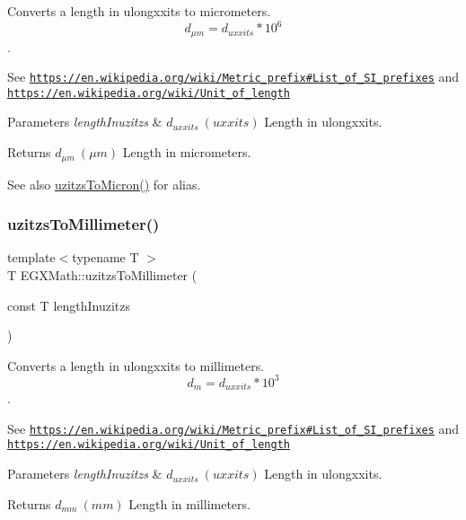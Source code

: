 Converts a length in ulongxxits to micrometers. \[ d_{\mu m}=d_{uxxits} * 10^{6} \]. 

See \href{https://en.wikipedia.org/wiki/Metric_prefix#List_of_SI_prefixes}{\tt https\+://en.\+wikipedia.\+org/wiki/\+Metric\+\_\+prefix\#\+List\+\_\+of\+\_\+\+S\+I\+\_\+prefixes} and \href{https://en.wikipedia.org/wiki/Unit_of_length}{\tt https\+://en.\+wikipedia.\+org/wiki/\+Unit\+\_\+of\+\_\+length} 
\begin{DoxyParams}{Parameters}
{\em length\+Inuzitzs} & $ d_{uxxits}\ (uxxits)$ Length in ulongxxits. \\
\hline
\end{DoxyParams}
\begin{DoxyReturn}{Returns}
$ d_{\mu m}\ (\mu m)$ Length in micrometers. 
\end{DoxyReturn}
\begin{DoxySeeAlso}{See also}
\mbox{\hyperlink{group___e_g_x_math-_conversions-_length_conversions-uzitzs-_non-_s_i_ga695a8fd8870537930d6378e99ad2aa9f}{uzitzs\+To\+Micron()}} for alias. 
\end{DoxySeeAlso}
\mbox{\label{group___e_g_x_math-_conversions-_length_conversions-uzitzs-_s_i_gaf507dd646327861da523586b417d132e}} 
\subsubsection{\texorpdfstring{uzitzs\+To\+Millimeter()}{uzitzsToMillimeter()}}
{\footnotesize\ttfamily template$<$typename T $>$ \\
T E\+G\+X\+Math\+::uzitzs\+To\+Millimeter (\begin{DoxyParamCaption}\item[{const T}]{length\+Inuzitzs }\end{DoxyParamCaption})}



Converts a length in ulongxxits to millimeters. \[ d_{m}=d_{uxxits} * 10^{3} \]. 

See \href{https://en.wikipedia.org/wiki/Metric_prefix#List_of_SI_prefixes}{\tt https\+://en.\+wikipedia.\+org/wiki/\+Metric\+\_\+prefix\#\+List\+\_\+of\+\_\+\+S\+I\+\_\+prefixes} and \href{https://en.wikipedia.org/wiki/Unit_of_length}{\tt https\+://en.\+wikipedia.\+org/wiki/\+Unit\+\_\+of\+\_\+length} 
\begin{DoxyParams}{Parameters}
{\em length\+Inuzitzs} & $ d_{uxxits}\ (uxxits)$ Length in ulongxxits. \\
\hline
\end{DoxyParams}
\begin{DoxyReturn}{Returns}
$ d_{mm}\ (mm)$ Length in millimeters. 
\end{DoxyReturn}
\mbox{\label{group___e_g_x_math-_conversions-_length_conversions-uzitzs-_s_i_ga6c21ffa2ef282d817d349c249eaaa21f}} 
